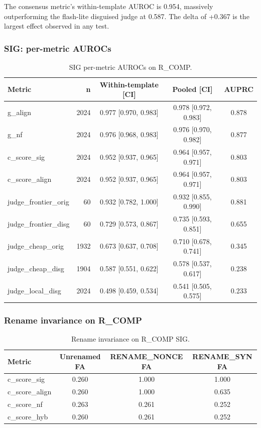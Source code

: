 \documentclass[11pt,letterpaper]{article}
\begin{document}
The consensus metric's within-template AUROC is 0.954, massively outperforming the flash-lite disguised judge at 0.587. The delta of +0.367 is the largest effect observed in any test.

\subsubsection{SIG: per-metric AUROCs}

\begin{table}[!htbp]
\centering
\caption{SIG per-metric AUROCs on R\_COMP.}
\label{tab:sig_permetric}
\begin{tabular}{lrccc}
\toprule
Metric & n & Within-template [CI] & Pooled [CI] & AUPRC \\
\midrule
g\_align & 2024 & 0.977 [0.970, 0.983] & 0.978 [0.972, 0.983] & 0.878 \\
g\_nf & 2024 & 0.976 [0.968, 0.983] & 0.976 [0.970, 0.982] & 0.877 \\
c\_score\_sig & 2024 & 0.952 [0.937, 0.965] & 0.964 [0.957, 0.971] & 0.803 \\
c\_score\_align & 2024 & 0.952 [0.937, 0.965] & 0.964 [0.957, 0.971] & 0.803 \\
judge\_frontier\_orig & 60 & 0.932 [0.782, 1.000] & 0.932 [0.855, 0.990] & 0.881 \\
judge\_frontier\_disg & 60 & 0.729 [0.573, 0.867] & 0.735 [0.593, 0.851] & 0.655 \\
judge\_cheap\_orig & 1932 & 0.673 [0.637, 0.708] & 0.710 [0.678, 0.741] & 0.345 \\
judge\_cheap\_disg & 1904 & 0.587 [0.551, 0.622] & 0.578 [0.537, 0.617] & 0.238 \\
judge\_local\_disg & 2024 & 0.498 [0.459, 0.534] & 0.541 [0.505, 0.575] & 0.233 \\
\bottomrule
\end{tabular}
\end{table}

\subsubsection{Rename invariance on R\_COMP}

\begin{table}[!htbp]
\centering
\caption{Rename invariance on R\_COMP SIG.}
\label{tab:rename_rcomp}
\begin{tabular}{lccc}
\toprule
Metric & Unrenamed FA & RENAME\_NONCE FA & RENAME\_SYN FA \\
\midrule
c\_score\_sig & 0.260 & 1.000 & 1.000 \\
c\_score\_align & 0.260 & 1.000 & 0.635 \\
c\_score\_nf & 0.263 & 0.261 & 0.252 \\
c\_score\_hyb & 0.260 & 0.261 & 0.252 \\
\bottomrule
\end{tabular}
\end{table}
\end{document}
